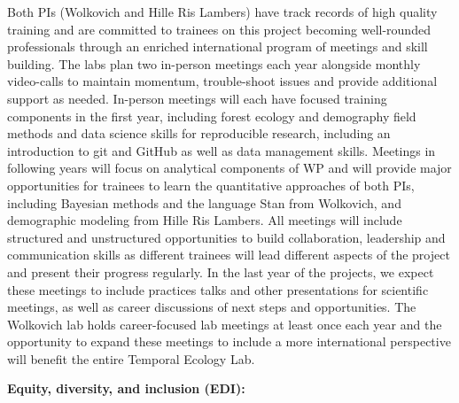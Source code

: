 \documentclass[11pt]{article}
\begin{document}
Both PIs (Wolkovich and Hille Ris Lambers) have track records of high quality training and are committed to trainees on this project becoming well-rounded professionals through an enriched international program of meetings and skill building. The labs plan two in-person meetings each year  alongside monthly video-calls to maintain momentum, trouble-shoot issues and provide additional support as needed. In-person meetings will each have focused training components in the first year, including forest ecology and demography field methods and data science skills for reproducible research, including an introduction to git and GitHub as well as data management skills. Meetings in following years will focus on analytical components of WP and will provide major opportunities for trainees to learn the quantitative approaches of both PIs, including Bayesian methods and the language Stan from Wolkovich, and demographic modeling from Hille Ris Lambers. All meetings will include structured and unstructured opportunities to build collaboration, leadership and communication skills as different trainees will lead different aspects of the project and present their progress regularly. In the last year of the projects, we expect these meetings to include practices talks and other presentations for scientific meetings, as well as career discussions of next steps and opportunities. The Wolkovich lab holds career-focused lab meetings at least once each year and the opportunity to expand these meetings to include a more international perspective will benefit the entire Temporal Ecology Lab. 

{\bf Equity, diversity, and inclusion (EDI):}  %
\end{document}
